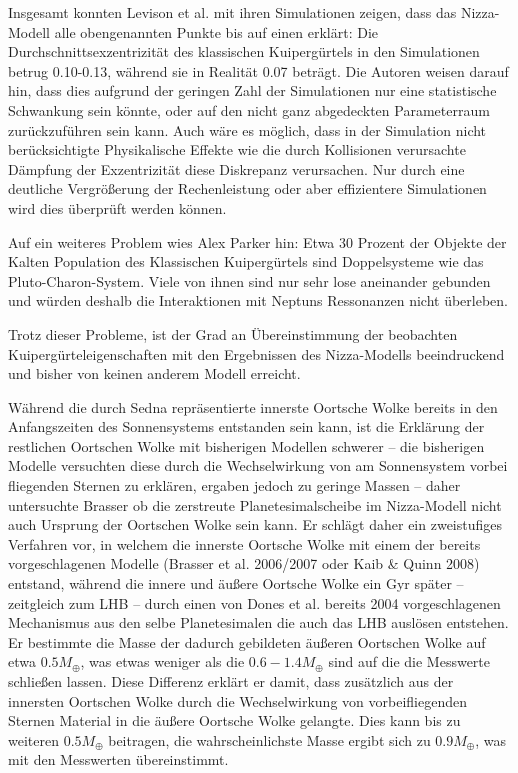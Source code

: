 \documentclass[10pt,a4paper,twoside]{article}
\begin{document}
Insgesamt konnten Levison et al. mit ihren Simulationen zeigen, dass das Nizza-Modell alle obengenannten Punkte bis auf einen erklärt: Die Durchschnittsexzentrizität des klassischen Kuipergürtels in den Simulationen betrug 0.10-0.13, während sie in Realität 0.07 beträgt\cite{Levison2008}.
Die Autoren weisen darauf hin, dass dies aufgrund der geringen Zahl der Simulationen nur eine statistische Schwankung sein könnte, oder auf den nicht ganz abgedeckten Parameterraum zurückzuführen sein kann\cite{Levison2008}. Auch wäre es möglich, dass in der Simulation nicht berücksichtigte Physikalische Effekte wie die durch Kollisionen verursachte Dämpfung der Exzentrizität diese Diskrepanz verursachen\cite{Levison2008}.
Nur durch eine deutliche Vergrößerung der Rechenleistung oder aber effizientere Simulationen wird dies überprüft werden können.

Auf ein weiteres Problem wies Alex Parker hin: %
Etwa 30 Prozent der Objekte der Kalten Population des Klassischen Kuipergürtels sind Doppelsysteme wie das Pluto-Charon-System. %
Viele von ihnen sind nur sehr lose aneinander gebunden und würden deshalb die Interaktionen mit Neptuns Ressonanzen nicht überleben. %

Trotz dieser Probleme, ist der Grad an Übereinstimmung der beobachten Kuipergürteleigenschaften mit den Ergebnissen des Nizza-Modells beeindruckend und bisher von keinen anderem Modell erreicht. %

Während die durch Sedna repräsentierte innerste Oortsche Wolke bereits in den Anfangszeiten des Sonnensystems entstanden sein kann, ist die Erklärung der restlichen Oortschen Wolke mit bisherigen Modellen schwerer – die bisherigen Modelle versuchten diese durch die Wechselwirkung von am Sonnensystem vorbei fliegenden Sternen zu erklären, ergaben jedoch zu geringe Massen – daher untersuchte Brasser ob die zerstreute Planetesimalscheibe im Nizza-Modell nicht auch Ursprung der Oortschen Wolke sein kann\cite{Brasser2008}.
Er schlägt daher ein zweistufiges Verfahren vor, in welchem die innerste Oortsche Wolke mit einem der bereits vorgeschlagenen Modelle (Brasser et al. 2006/2007 oder Kaib \& Quinn 2008) entstand, während die innere und äußere Oortsche Wolke ein Gyr später – zeitgleich zum LHB – durch einen von Dones et al. bereits 2004 vorgeschlagenen Mechanismus aus den selbe Planetesimalen die auch das LHB auslösen entstehen\cite{Brasser2008}. %
Er bestimmte die Masse der dadurch gebildeten äußeren Oortschen Wolke auf etwa $0.5 M_\oplus$, was etwas weniger als die $0.6-1.4 M_\oplus$ sind auf die die Messwerte schließen lassen\cite{Brasser2008}. Diese Differenz erklärt er damit, dass zusätzlich aus der innersten Oortschen Wolke durch die Wechselwirkung von vorbeifliegenden Sternen Material in die äußere Oortsche Wolke gelangte\cite{Brasser2008}.
Dies kann bis zu weiteren $0.5 M_\oplus$ beitragen, die wahrscheinlichste Masse ergibt sich zu $0.9 M_\oplus$, was mit den Messwerten übereinstimmt\cite{Brasser2008}.
\end{document}
